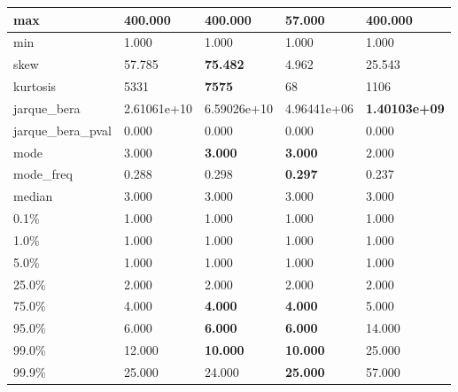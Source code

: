\begin{table}[H]
\begin{tabular}{|l|m{10em}|m{10em}|m{10em}|m{10em}|}
\hline max & 400.000 & \bfseries 400.000 & \cellcolor[rgb]{0.9, 0.54, 0.52} 57.000 & \bfseries 400.000 \\
\hline min & 1.000 & 1.000 & 1.000 & 1.000 \\
\hline skew & 57.785 & \bfseries 75.482 & \cellcolor[rgb]{0.9, 0.54, 0.52} 4.962 & 25.543 \\
\hline kurtosis & 5331 & \bfseries 7575 & \cellcolor[rgb]{0.9, 0.54, 0.52} 68 & 1106 \\
\hline jarque\_bera & 2.61061e+10 & \cellcolor[rgb]{0.9, 0.54, 0.52} 6.59026e+10 & 4.96441e+06 & \bfseries 1.40103e+09 \\
\hline jarque\_bera\_pval & 0.000 & 0.000 & 0.000 & 0.000 \\
\hline mode & 3.000 & \bfseries 3.000 & \bfseries 3.000 & \cellcolor[rgb]{0.9, 0.54, 0.52} 2.000 \\
\hline mode\_freq & 0.288 & 0.298 & \bfseries 0.297 & \cellcolor[rgb]{0.9, 0.54, 0.52} 0.237 \\
\hline median & 3.000 & 3.000 & 3.000 & 3.000 \\
\hline 0.1\% & 1.000 & 1.000 & 1.000 & 1.000 \\
\hline 1.0\% & 1.000 & 1.000 & 1.000 & 1.000 \\
\hline 5.0\% & 1.000 & 1.000 & 1.000 & 1.000 \\
\hline 25.0\% & 2.000 & 2.000 & 2.000 & 2.000 \\
\hline 75.0\% & 4.000 & \bfseries 4.000 & \bfseries 4.000 & \cellcolor[rgb]{0.9, 0.54, 0.52} 5.000 \\
\hline 95.0\% & 6.000 & \bfseries 6.000 & \bfseries 6.000 & \cellcolor[rgb]{0.9, 0.54, 0.52} 14.000 \\
\hline 99.0\% & 12.000 & \bfseries 10.000 & \bfseries 10.000 & \cellcolor[rgb]{0.9, 0.54, 0.52} 25.000 \\
\hline 99.9\% & 25.000 & 24.000 & \bfseries 25.000 & \cellcolor[rgb]{0.9, 0.54, 0.52} 57.000 \\
\hline
\end{tabular}
\end{table}
